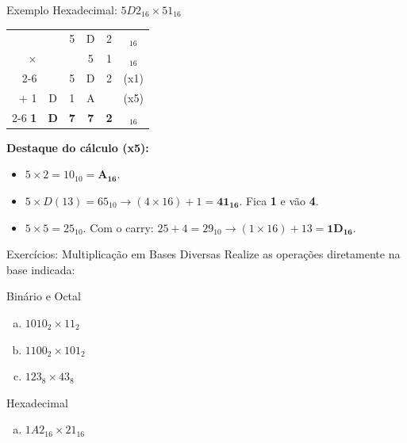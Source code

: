 \begin{frame}{Exemplo Hexadecimal: $5D2_{16} \times 51_{16}$}
    \centering
    \Large
    \begin{tabular}{r ccccc}
                   &            & 5          & D          & 2          & $_{16}$          \\
        $\times$   &            &            & 5          & 1          & $_{16}$          \\ \cline{2-6}
                   &            & 5          & D          & 2          & (x1)             \\
        + 1        & D          & 1          & A          &            & (x5)             \\ \cline{2-6}
        \textbf{1} & \textbf{D} & \textbf{7} & \textbf{7} & \textbf{2} & \textbf{$_{16}$} \\
    \end{tabular}

    \vspace{0.4cm}
    \flushleft
    \small
    \textbf{Destaque do cálculo (x5):}
    \begin{itemize}
        \item $5 \times 2 = 10_{10} = \mathbf{A_{16}}$.
        \item $5 \times D (13) = 65_{10} \rightarrow (4 \times 16) + 1 = \mathbf{41_{16}}$. Fica \textbf{1} e vão \textbf{4}.
        \item $5 \times 5 = 25_{10}$. Com o carry: $25 + 4 = 29_{10} \rightarrow (1 \times 16) + 13 = \mathbf{1D_{16}}$.
    \end{itemize}
\end{frame}

\begin{frame}{Exercícios: Multiplicação em Bases Diversas}
    Realize as operações diretamente na base indicada:

    \begin{block}{Binário e Octal}
        \begin{enumerate}[a)]
            \item $1010_2 \times 11_2$
            \item $1100_2 \times 101_2$
            \item $123_8 \times 43_8$
        \end{enumerate}
    \end{block}

    \begin{block}{Hexadecimal}
        \begin{enumerate}[d)]
            \item $1A2_{16} \times 21_{16}$
        \end{enumerate}
    \end{block}




\end{frame}

